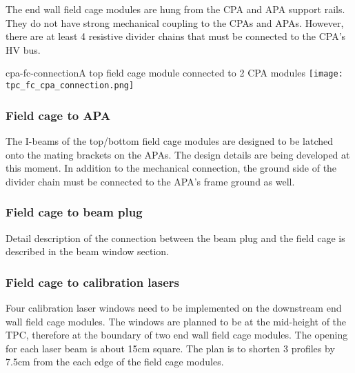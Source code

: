 The end wall field cage modules are hung from the CPA and APA support rails.  They do not have strong mechanical coupling to the CPAs and APAs. However, there are at least 4 resistive divider chains that must be connected to the CPA's HV bus.

\begin{cdrfigure}{cpa-fc-connection}{A top field cage module connected to 2 CPA modules}
\texttt{[image: tpc\_fc\_cpa\_connection.png]}
\end{cdrfigure}


\subsubsection{Field cage to APA}

The I-beams of the top/bottom field cage modules are designed to be latched onto the mating brackets on the APAs.  The design details are being developed at this moment.  In addition to the mechanical connection, the ground side of the divider chain must be connected to the APA's frame ground as well.


\subsubsection{Field cage to beam plug}

Detail description of the connection between the beam plug and the field cage is described in the beam window section.



\subsubsection{Field cage to calibration lasers}

Four calibration laser windows need to be implemented on the downstream end wall field cage modules.  The windows are planned to be at the mid-height of the TPC, therefore at the boundary of two end wall field cage modules.  The opening for each laser beam is about 15cm square.  The plan is to shorten 3 profiles by 7.5cm from the each edge of the field cage modules.




 


